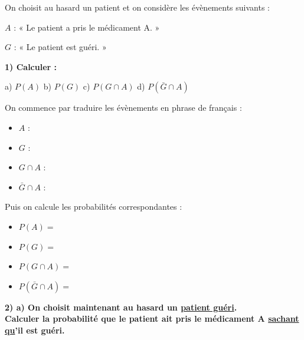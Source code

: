 \documentclass[12pt]{article}
\begin{document}
\vspace{5pt}
On choisit au hasard un patient et on considère les évènements suivants :

\vspace{5pt}
\hspace{1cm}$A$ : « Le patient a pris le médicament A. »

\hspace{1cm}$G$ : « Le patient est guéri. »

\vspace{5pt}
\textbf{1) Calculer :}

\vspace{5pt}
\hspace{1cm}a) $P(A)$ \hspace{1cm}b) $P(G)$ 
\hspace{1cm}c) $P(G \cap A)$ \hspace{1cm}d) $P(\bar{G} \cap A)$

\vspace{10pt}
On commence par traduire les évènements en phrase de français :

\begin{itemize}
    \item $A$ : 
    \vspace{10pt}
    \item $G$ : 
    \vspace{10pt}
    \item $G \cap A$ : 
    \vspace{10pt}
    \item $\bar{G} \cap A$ : 
\end{itemize}

\vspace{10pt}
Puis on calcule les probabilités correspondantes : 

\begin{itemize}
    \vspace{10pt}
    \item $P(A) = $
    \vspace{10pt}
    \item $P(G) = $ 
    \vspace{10pt}
    \item $P(G \cap A) = $
    \vspace{10pt}
    \item $P(\bar{G} \cap A) = $
\end{itemize}

\vspace{10pt}
\textbf{2) a) On choisit maintenant au hasard un \underline{patient guéri}.
\\Calculer la probabilité que le patient ait pris le médicament A \underline{sachant qu}'il est guéri.}
\end{document}

